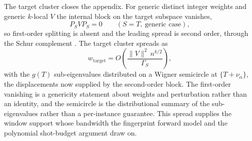The target cluster closes the appendix. For generic distinct integer weights and generic $k$-local $V$ the internal block on the target subspace vanishes,
\begin{equation*}
P_S V P_S = 0 \qquad (S = T ,\ \text{generic case}) ,
\end{equation*}
so first-order splitting is absent and the leading spread is second order, through the Schur complement \cite{horn2013matrix, bhatia1997matrix}. The target cluster spreads as
\begin{equation*}
w_{\mathrm{target}} = O\!\left( \frac{\|V\|^2 \, n^{k/2}}{\Gamma_S} \right) ,
\end{equation*}
with the $g(T)$ sub-eigenvalues distributed on a Wigner semicircle at $\{ T + \nu_\alpha \}$, the displacements now supplied by the second-order block. The first-order vanishing is a genericity statement about weights and perturbation rather than an identity, and the semicircle is the distributional summary of the sub-eigenvalues rather than a per-instance guarantee. This spread supplies the window support whose bandwidth the fingerprint forward model and the polynomial shot-budget argument draw on.
